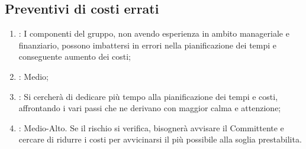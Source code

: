 \subsection{Preventivi di costi errati}
\begin{enumerate}
\item {}: I componenti del gruppo, non avendo esperienza in ambito manageriale e finanziario, possono imbattersi in errori nella pianificazione dei tempi e conseguente aumento dei costi;
\item {}: Medio;
\item {}: Si cercherà di dedicare più tempo alla pianificazione dei tempi e costi, affrontando i vari passi che ne derivano con maggior calma e attenzione;
\item {}: Medio-Alto. Se il rischio si verifica, bisognerà avvisare il Committente e cercare di ridurre i costi per avvicinarsi il più possibile alla soglia prestabilita.
\end{enumerate}